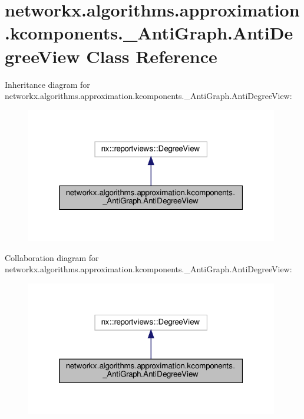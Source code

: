\hypertarget{classnetworkx_1_1algorithms_1_1approximation_1_1kcomponents_1_1__AntiGraph_1_1AntiDegreeView}{}\section{networkx.\+algorithms.\+approximation.\+kcomponents.\+\_\+\+Anti\+Graph.\+Anti\+Degree\+View Class Reference}
\label{classnetworkx_1_1algorithms_1_1approximation_1_1kcomponents_1_1__AntiGraph_1_1AntiDegreeView}


Inheritance diagram for networkx.\+algorithms.\+approximation.\+kcomponents.\+\_\+\+Anti\+Graph.\+Anti\+Degree\+View\+:
\nopagebreak
\begin{figure}[H]
\begin{center}
\leavevmode
\includegraphics[width=313pt]{classnetworkx_1_1algorithms_1_1approximation_1_1kcomponents_1_1__AntiGraph_1_1AntiDegreeView__inherit__graph}
\end{center}
\end{figure}


Collaboration diagram for networkx.\+algorithms.\+approximation.\+kcomponents.\+\_\+\+Anti\+Graph.\+Anti\+Degree\+View\+:
\nopagebreak
\begin{figure}[H]
\begin{center}
\leavevmode
\includegraphics[width=313pt]{classnetworkx_1_1algorithms_1_1approximation_1_1kcomponents_1_1__AntiGraph_1_1AntiDegreeView__coll__graph}
\end{center}
\end{figure}
